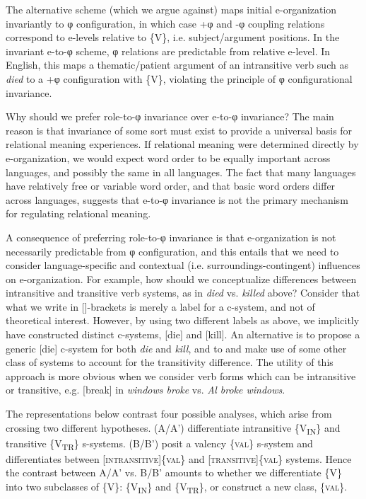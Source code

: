   The alternative scheme (which we argue against) maps initial e-organization invariantly to φ configuration, in which case +φ and -φ coupling relations correspond to e-levels relative to \{V\}, i.e. subject/argument positions. In the invariant e-to-φ scheme, φ relations are predictable from relative e-level. In English, this maps a thematic/patient argument of an intransitive verb such as \textit{died} to a +φ configuration with \{V\}, violating the principle of φ configurational invariance.

  Why should we prefer role-to-φ invariance over e-to-φ invariance? The main reason is that invariance of some sort must exist to provide a universal basis for relational meaning experiences. If relational meaning were determined directly by e-organization, we would expect word order to be equally important across languages, and possibly the same in all languages. The fact that many languages have relatively free or variable word order, and that basic word orders differ across languages, suggests that e-to-φ invariance is not the primary mechanism for regulating relational meaning. 

  A consequence of preferring role-to-φ invariance is that e-organization is not necessarily predictable from φ configuration, and this entails that we need to consider language-specific and contextual (i.e. surroundings-contingent) influences on e-organization. For example, how should we conceptualize differences between intransitive and transitive verb systems, as in \textit{died} vs. \textit{killed} above? Consider that what we write in []-brackets is merely a label for a c-system, and not of theoretical interest. However, by using two different labels as above, we implicitly have constructed distinct c-systems, [die] and [kill]. An alternative is to propose a generic [die] c-system for both \textit{die} and \textit{kill}, and to and make use of some other class of systems to account for the transitivity difference. The utility of this approach is more obvious when we consider verb forms which can be intransitive or transitive, e.g. [break] in \textit{windows broke} vs. \textit{Al broke windows}. 

  The representations below contrast four possible analyses, which arise from crossing two different hypotheses. (A/A') differentiate intransitive \{V\textsubscript{IN}\} and transitive \{V\textsubscript{TR}\} s-systems. (B/B') posit a valency \{\textsc{val}\} s-system and differentiates between [\textsc{intransitive}]\{\textsc{val}\} and [\textsc{transitive}]\{\textsc{val}\} systems. Hence the contrast between A/A' vs. B/B' amounts to whether we differentiate \{V\} into two subclasses of \{V\}: \{V\textsubscript{IN}\} and \{V\textsubscript{TR}\}, or construct a new class, \{\textsc{val}\}.


